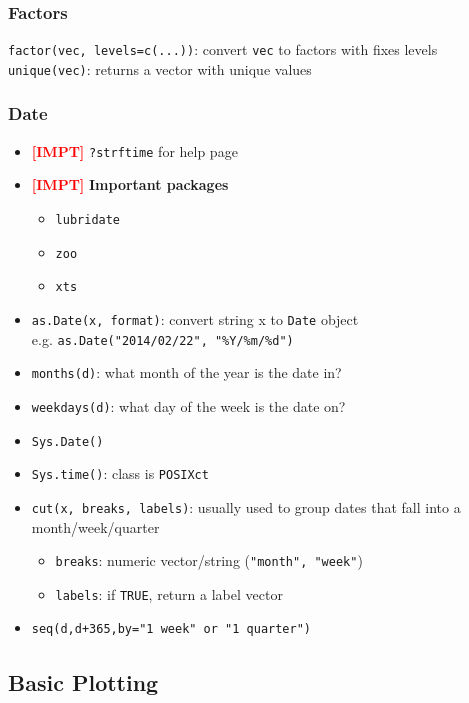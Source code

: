\documentclass{article}
\newcommand{\impt}[0]{\textcolor{red}{\textbf{[IMPT] }}}
\begin{document}
\begin{multicols}{2}
\subsubsection*{Factors}
\texttt{factor(vec, levels=c(...))}: convert \texttt{vec} to factors with fixes levels\\
\texttt{unique(vec)}: returns a vector with unique values

\subsubsection*{Date}
\begin{itemize}
	\item \impt \texttt{?strftime} for help page
	\item \impt \textbf{Important packages}
	\begin{itemize}
		\item \texttt{lubridate}
		\item \texttt{zoo}
		\item \texttt{xts}
	\end{itemize}
	\item \texttt{as.Date(x, format)}: convert string x to \texttt{Date} object \\ e.g. \texttt{as.Date("2014/02/22", "\%Y/\%m/\%d")}
	\item \texttt{months(d)}: what month of the year is the date in?
	\item \texttt{weekdays(d)}: what day of the week is the date on?
	\item \texttt{Sys.Date()}
	\item \texttt{Sys.time()}: class is \texttt{POSIXct}
	\item \texttt{cut(x, breaks, labels)}: usually used to group dates that fall into a month/week/quarter
	\begin{itemize}
		\item \texttt{breaks}: numeric vector/string (\texttt{"month", "week"})
		\item \texttt{labels}: if \texttt{TRUE}, return a label vector
	\end{itemize}
\item \texttt{seq(d,d+365,by="1 week" or "1 quarter")}

\end{itemize}

\subsection*{Basic Plotting}

\end{multicols}
\end{document}
